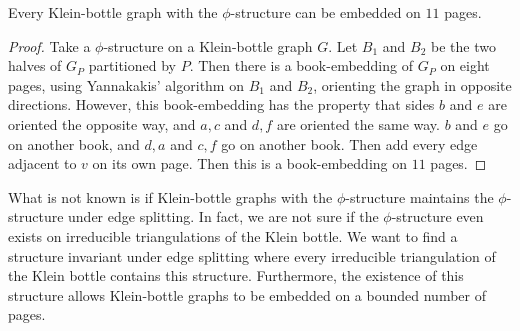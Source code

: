 \begin{claim}
    Every Klein-bottle graph with the $\phi$-structure can be embedded on $11$ pages. 
\end{claim}
\begin{proof}
    Take a $\phi$-structure on a Klein-bottle graph $G$. Let $B_1$ and $B_2$ be the two halves of $G_P$ partitioned by $P$. Then there is a book-embedding of $G_P$ on eight pages, using Yannakakis' algorithm on $B_1$ and $B_2$, orienting the graph in opposite directions. However, this book-embedding has the property that sides $b$ and $e$ are oriented the opposite way, and $a, c$ and $d, f$ are oriented the same way. $b$ and $e$ go on another book, and $d, a$ and $c, f$ go on another book. Then add every edge adjacent to $v$ on its own page. Then this is a book-embedding on $11$ pages. 
\end{proof}

What is not known is if Klein-bottle graphs with the $\phi$-structure maintains the $\phi$-structure under edge splitting. In fact, we are not sure if the $\phi$-structure even exists on irreducible triangulations of the Klein bottle. We want to find a structure invariant under edge splitting where every irreducible triangulation of the Klein bottle contains this structure. Furthermore, the existence of this structure allows Klein-bottle graphs to be embedded on a bounded number of pages.
